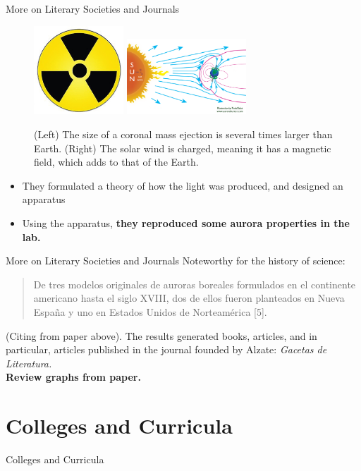 \documentclass{beamer}
\begin{document}
\begin{frame}{More on Literary Societies and Journals}
\small
\begin{figure}
\includegraphics[width=0.3\textwidth]{figures/rad.jpg}
\includegraphics[width=0.4\textwidth]{figures/how-the-auroras-form.png}
\caption{(Left) The size of a coronal mass ejection is several times larger than Earth. (Right) The solar wind is charged, meaning it has a magnetic field, which adds to that of the Earth.}
\end{figure}
\begin{itemize}
\item They formulated a theory of how the light was produced, and designed an apparatus
\item Using the apparatus, \textbf{they reproduced some aurora properties in the lab.}
\end{itemize}
\end{frame}

\begin{frame}{More on Literary Societies and Journals}
\alert{Noteworthy for the history of science}: \\ \vspace{0.5cm}
\begin{quote}
De tres modelos originales de auroras boreales formulados en el continente americano hasta el siglo XVIII, dos de ellos fueron planteados en Nueva España y uno en Estados Unidos de Norteamérica [5].
\end{quote}
(Citing from paper above).  The results generated books, articles, and in particular, articles published in the journal founded by Alzate: \textit{Gacetas de Literatura.} \\
\textbf{Review graphs from paper.}
\end{frame}

\section{Colleges and Curricula}

\begin{frame}{Colleges and Curricula}

\end{frame}
\end{document}
